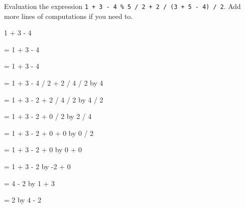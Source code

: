 \newpage
\nextq
Evaluation the expression \verb!1 + 3 - 4 % 5 / 2 + 2 / (3 + 5 - 4) / 2!.
Add more lines of computations if you need to.
\\
\ANSWER
\begin{answercode}
1 + 3 - 4 %

= 1 + 3 - 4 %

= 1 + 3 - 4 %

= 1 + 3 - 4 / 2 + 2 / 4 / 2                             by 4 %

= 1 + 3 - 2 + 2 / 4 / 2                                 by 4 / 2

= 1 + 3 - 2 + 0 / 2                                     by 2 / 4

= 1 + 3 - 2 + 0 + 0                                     by 0 / 2

= 1 + 3 - 2 + 0                                         by 0 + 0

= 1 + 3 - 2                                             by -2 + 0

= 4 - 2                                                 by 1 + 3

= 2                                                     by 4 - 2

\end{answercode}


